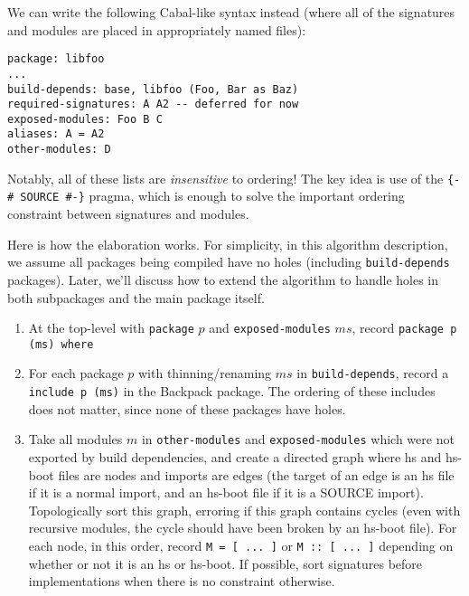 \documentclass{article}
\begin{document}
We can write the following Cabal-like syntax instead (where
all of the signatures and modules are placed in appropriately
named files):

\begin{verbatim}
package: libfoo
...
build-depends: base, libfoo (Foo, Bar as Baz)
required-signatures: A A2 -- deferred for now
exposed-modules: Foo B C
aliases: A = A2
other-modules: D
\end{verbatim}

Notably, all of these lists are \emph{insensitive} to ordering!
The key idea is use of the \verb|{-# SOURCE #-}| pragma, which
is enough to solve the important ordering constraint between
signatures and modules.

Here is how the elaboration works.  For simplicity, in this algorithm
description, we assume all packages being compiled have no holes
(including \verb|build-depends| packages). Later, we'll discuss how to
extend the algorithm to handle holes in both subpackages and the main
package itself.

\begin{enumerate}

    \item At the top-level with \verb|package| $p$ and
        \verb|exposed-modules| $ms$, record \verb|package p (ms) where|

    \item For each package $p$ with thinning/renaming $ms$ in
        \verb|build-depends|, record a \verb|include p (ms)| in the
        Backpack package.  The ordering of these includes does not
        matter, since none of these packages have holes.

    \item Take all modules $m$ in \verb|other-modules| and
        \verb|exposed-modules| which were not exported by build
        dependencies, and create a directed graph where hs and hs-boot
        files are nodes and imports are edges (the target of an edge is
        an hs file if it is a normal import, and an hs-boot file if it
        is a SOURCE import).  Topologically sort this graph, erroring if
        this graph contains cycles (even with recursive modules, the
        cycle should have been broken by an hs-boot file).  For each
        node, in this order, record \verb|M = [ ... ]| or \verb|M :: [ ... ]|
        depending on whether or not it is an hs or hs-boot.  If possible,
        sort signatures before implementations when there is no constraint
        otherwise.

\end{enumerate}
\end{document}
